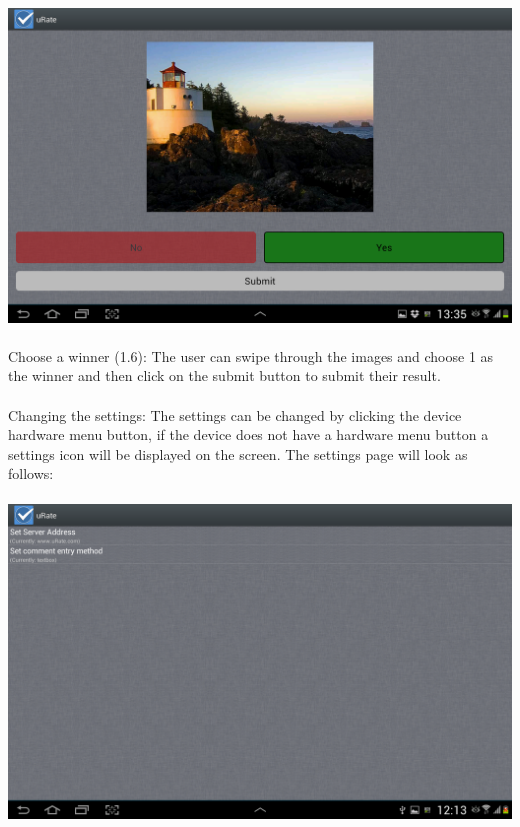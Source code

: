 \documentclass[10pt,a4paper]{article}
\begin{document}
\paragraph{}
\includegraphics[scale=0.3]{Pictures/YesNo.png}
\paragraph{}
Choose a winner (1.6):
The user can swipe through the images and choose 1 as the winner and then click on the submit button to submit their result.
\paragraph{}
Changing the settings:
The settings can be changed by clicking the device hardware menu button, if the device does not have a hardware menu button a settings icon will be displayed on the screen. The settings page will look as follows:
\paragraph{}
\includegraphics[scale=0.3]{Pictures/Settings.png}
\end{document}
